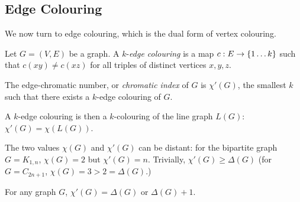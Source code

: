 \documentclass{article}
\begin{document}

\subsection{Edge Colouring}

We now turn to edge colouring, which is the dual form of vertex colouring.

\begin{definition}
    Let $G = (V, E)$ be a graph. A $k$-\textit{edge colouring} is a map $c: E \to \left\lbrace 1 \dots k \right\rbrace$ such that $c(xy) \neq c(xz)$ for all triples of distinct vertices $x, y, z$.
    
    The edge-chromatic number, or \textit{chromatic index} of $G$ is $\chi'(G)$, the smallest $k$ such that there exists a $k$-edge colouring of $G$.
\end{definition}

A $k$-edge colouring is then a $k$-colouring of the line graph $L(G)$: $\chi'(G) = \chi(L(G))$.

\begin{note}
	The two values $\chi(G)$ and $\chi'(G)$ can be distant: for the bipartite graph $G = K_{1,n}$, $\chi(G) = 2$ but $\chi'(G) = n$. Trivially, $\chi'(G) \geq \Delta(G)$ (for $G = C_{2n+1}$, $\chi(G) = 3 > 2 = \Delta(G)$.)
\end{note}

\begin{theorem}
    \label{vizings-theorem}
    For any graph $G$, $\chi'(G) = \Delta(G)$ or $\Delta(G) + 1$.
\end{theorem}
\end{document}
